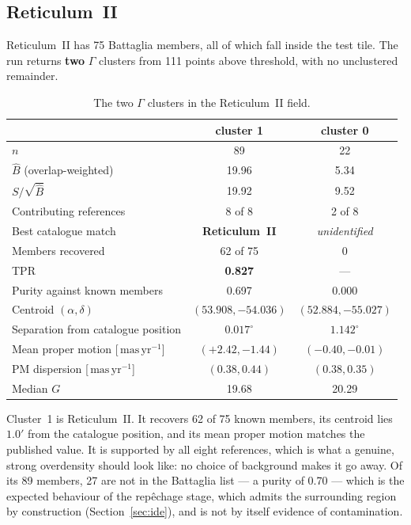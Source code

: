 \documentclass[11pt,a4paper]{article}
\newcommand{\unit}[1]{\ensuremath{\,\mathrm{#1}}}
\newcommand{\masyr}{\unit{mas\,yr^{-1}}}
\newcommand{\Ups}{\Upsilon}                  %
\newcommand{\Gam}{\Gamma}                    %
\newcommand{\Ups}{\Upsilon}
\newcommand{\Gam}{\Gamma}
\newcommand{\Bhat}{\hat{B}}
\newcommand{\srb}{S/\sqrt{\Bhat}}
\newcommand{\masyr}{\mathrm{mas\,yr^{-1}}}
\newcommand{\dg}{^{\circ}}
\begin{document}
\subsection{Reticulum~II}
\label{sec:retii}

Reticulum~II has 75 Battaglia members, all of which fall inside the test tile. The run returns
\textbf{two} $\Gam$ clusters from 111 points above threshold, with no unclustered remainder.

\begin{table}[h]
\centering\small
\caption{The two $\Gam$ clusters in the Reticulum~II field.}
\begin{tabular}{@{}lcc@{}}
\toprule
 & cluster 1 & cluster 0\\
\midrule
$n$                                   & 89 & 22\\
$\Bhat$ (overlap-weighted)            & 19.96 & 5.34\\
$\srb$                                & 19.92 & 9.52\\
Contributing references               & 8 of 8 & 2 of 8\\
Best catalogue match                  & \textbf{Reticulum~II} & \emph{unidentified}\\
Members recovered                     & 62 of 75 & 0\\
TPR                                   & \textbf{0.827} & ---\\
Purity against known members          & 0.697 & 0.000\\
Centroid $(\alpha,\delta)$            & $(53.908, -54.036)$ & $(52.884, -55.027)$\\
Separation from catalogue position    & $0.017\dg$ & $1.142\dg$\\
Mean proper motion [$\masyr$]         & $(+2.42, -1.44)$ & $(-0.40, -0.01)$\\
PM dispersion [$\masyr$]              & $(0.38, 0.44)$ & $(0.38, 0.35)$\\
Median $G$                            & 19.68 & 20.29\\
\bottomrule
\end{tabular}
\end{table}

Cluster~1 is Reticulum~II. It recovers 62 of 75 known members, its centroid lies $1.0'$ from the
catalogue position, and its mean proper motion matches the published value. It is supported by all
eight references, which is what a genuine, strong overdensity should look like: no choice of
background makes it go away. Of its 89 members, 27 are not in the Battaglia list --- a purity of
0.70 --- which is the expected behaviour of the rep\^echage stage, which admits the surrounding
region by construction (Section~\ref{sec:ide}), and is not by itself evidence of contamination.
\end{document}
